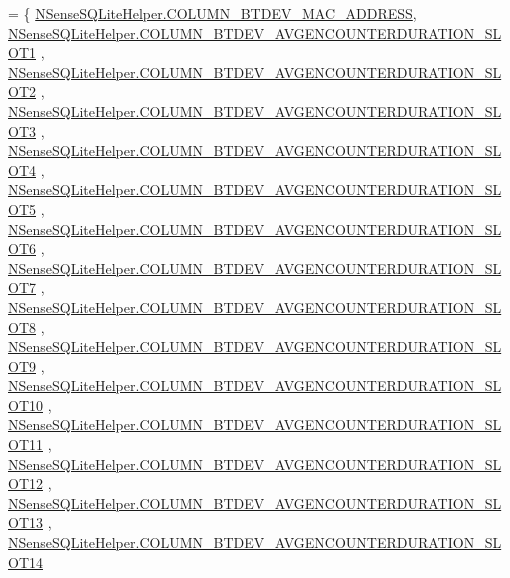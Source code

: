 \begin{DoxyCode}
= \{ 
            \hyperlink{classcs_1_1nsense_1_1db_1_1_n_sense_s_q_lite_helper_a66d760b81948efc86eafb0bb5147c2a5}{NSenseSQLiteHelper.COLUMN\_BTDEV\_MAC\_ADDRESS},
            \hyperlink{classcs_1_1nsense_1_1db_1_1_n_sense_s_q_lite_helper_a01abb8709f16bb28bf7779efee94ac3a}{NSenseSQLiteHelper.COLUMN\_BTDEV\_AVGENCOUNTERDURATION\_SLOT1}
      ,
            \hyperlink{classcs_1_1nsense_1_1db_1_1_n_sense_s_q_lite_helper_a14a25d28cd5b4e703d0cd168fa139afe}{NSenseSQLiteHelper.COLUMN\_BTDEV\_AVGENCOUNTERDURATION\_SLOT2}
      ,
            \hyperlink{classcs_1_1nsense_1_1db_1_1_n_sense_s_q_lite_helper_a56b3605c7035238a393c85fcd728b6f4}{NSenseSQLiteHelper.COLUMN\_BTDEV\_AVGENCOUNTERDURATION\_SLOT3}
      ,
            \hyperlink{classcs_1_1nsense_1_1db_1_1_n_sense_s_q_lite_helper_a32daef921c1403dad6e392b7e6175807}{NSenseSQLiteHelper.COLUMN\_BTDEV\_AVGENCOUNTERDURATION\_SLOT4}
      ,
            \hyperlink{classcs_1_1nsense_1_1db_1_1_n_sense_s_q_lite_helper_a1c7b3ac072abf5067e215710ff923d3a}{NSenseSQLiteHelper.COLUMN\_BTDEV\_AVGENCOUNTERDURATION\_SLOT5}
      ,
            \hyperlink{classcs_1_1nsense_1_1db_1_1_n_sense_s_q_lite_helper_af08de2fe7b75c324ff9b5d3c713ba4d9}{NSenseSQLiteHelper.COLUMN\_BTDEV\_AVGENCOUNTERDURATION\_SLOT6}
      ,
            \hyperlink{classcs_1_1nsense_1_1db_1_1_n_sense_s_q_lite_helper_a888f87fe7e2d20149ea4a75c83665e13}{NSenseSQLiteHelper.COLUMN\_BTDEV\_AVGENCOUNTERDURATION\_SLOT7}
      ,
            \hyperlink{classcs_1_1nsense_1_1db_1_1_n_sense_s_q_lite_helper_acddc3fed55cd2104452b8ced0bc2e616}{NSenseSQLiteHelper.COLUMN\_BTDEV\_AVGENCOUNTERDURATION\_SLOT8}
      ,
            \hyperlink{classcs_1_1nsense_1_1db_1_1_n_sense_s_q_lite_helper_a6db3acd70272fce4a431e6f529acbf7f}{NSenseSQLiteHelper.COLUMN\_BTDEV\_AVGENCOUNTERDURATION\_SLOT9}
      ,
            \hyperlink{classcs_1_1nsense_1_1db_1_1_n_sense_s_q_lite_helper_a95a081220d68d8e653f3b185c85e2590}{NSenseSQLiteHelper.COLUMN\_BTDEV\_AVGENCOUNTERDURATION\_SLOT10}
      ,
            \hyperlink{classcs_1_1nsense_1_1db_1_1_n_sense_s_q_lite_helper_ae18ebf70e1ed9a14210d2b1b24ec4726}{NSenseSQLiteHelper.COLUMN\_BTDEV\_AVGENCOUNTERDURATION\_SLOT11}
      ,
            \hyperlink{classcs_1_1nsense_1_1db_1_1_n_sense_s_q_lite_helper_a8b66fb3e7675417d15034e51c6031bd1}{NSenseSQLiteHelper.COLUMN\_BTDEV\_AVGENCOUNTERDURATION\_SLOT12}
      ,
            \hyperlink{classcs_1_1nsense_1_1db_1_1_n_sense_s_q_lite_helper_a032e9a2a6b81ee461d88cd3e20da323c}{NSenseSQLiteHelper.COLUMN\_BTDEV\_AVGENCOUNTERDURATION\_SLOT13}
      ,
            \hyperlink{classcs_1_1nsense_1_1db_1_1_n_sense_s_q_lite_helper_abcc96b7e96f231319c945b5a1c0dfed4}{NSenseSQLiteHelper.COLUMN\_BTDEV\_AVGENCOUNTERDURATION\_SLOT14}

\end{DoxyCode}
